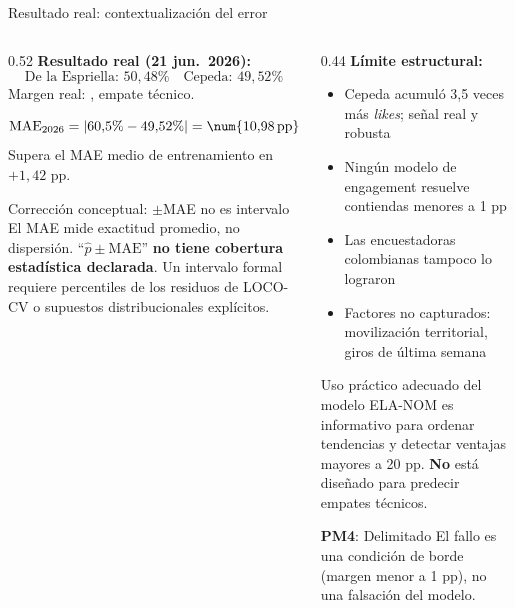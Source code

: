 \begin{frame}{Resultado real: contextualización del error \corr{[Corr.\ 1.17/2.4]}}
  \begin{columns}[T]
    \begin{column}{0.52\textwidth}
      \textbf{Resultado real (21 jun.\ 2026):}
      \[
        \text{De la Espriella: } 50{,}48\%
        \quad
        \text{Cepeda: } 49{,}52\%
      \]
      Margen real: , empate técnico.

      \vspace{0.2em}
      \[
        \text{MAE}_{2026} = |60{,}5\% - 49{,}52\%| = \num{10{,}98\,\text{pp}}
      \]
      Supera el MAE medio de entrenamiento en $+1{,}42$ pp.

      \vspace{0.2em}
      \begin{alertblock}{Corrección conceptual: $\pm$MAE no es intervalo}
        \small El MAE mide exactitud promedio, no dispersión.
        ``$\hat{p} \pm \text{MAE}$'' \textbf{no tiene cobertura estadística declarada}.
        Un intervalo formal requiere percentiles de los residuos de LOCO-CV
        o supuestos distribucionales explícitos.
      \end{alertblock}
    \end{column}
    \begin{column}{0.44\textwidth}
      \textbf{Límite estructural:}
      \begin{itemize}\small
        \item Cepeda acumuló 3,5 veces más \textit{likes}; señal real y robusta
        \item Ningún modelo de engagement resuelve contiendas menores a 1 pp
        \item Las encuestadoras colombianas tampoco lo lograron
        \item Factores no capturados: movilización territorial, giros de última semana
      \end{itemize}
      \vspace{0.3em}
      \begin{block}{Uso práctico adecuado del modelo}
        \small ELA-NOM es informativo para ordenar tendencias y detectar
        ventajas mayores a 20 pp. \textbf{No} está diseñado para predecir
        empates técnicos.
      \end{block}
      \vspace{0.2em}
      \begin{exampleblock}{\textbf{PM4}: Delimitado}
        \small El fallo es una condición de borde (margen menor a 1 pp),
        no una falsación del modelo.
      \end{exampleblock}
    \end{column}
  \end{columns}
\end{frame}
